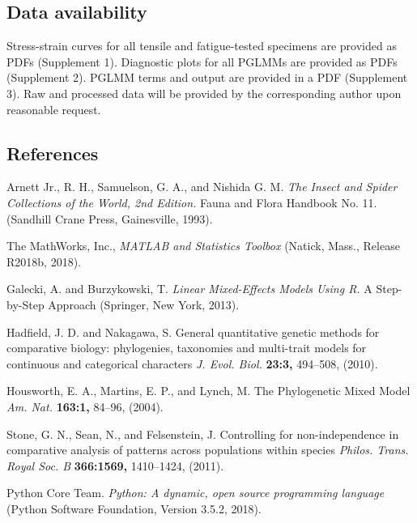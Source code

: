 \documentclass[twocolumn, linenumbers, superscriptaddress, nofootinbib]{revtex4-1}
\begin{document}
		\subsection*{Data availability}
			Stress-strain curves for all tensile and fatigue-tested specimens are provided as PDFs (Supplement 1).
			Diagnostic plots for all PGLMMs are provided as PDFs (Supplement 2). PGLMM terms and output are provided in a PDF (Supplement 3). Raw and processed data will be provided by the corresponding author upon reasonable request.

	\begin{thebibliography}{50}
		\makeatletter
		\addtocounter{NAT@ctr}{45}
		\makeatother
		\section*{References}	
				Arnett Jr., R. H., Samuelson, G. A., and Nishida G. M.
				\textit{The Insect and Spider Collections of the World, 2nd Edition.}
				Fauna and Flora Handbook No. 11.
				(Sandhill Crane Press,
				Gainesville,
				1993).
			
				The MathWorks, Inc.,
				\textit{MATLAB and Statistics Toolbox}
				(Natick, Mass.,
				Release R2018b,
				2018).
			
				Galecki, A. and Burzykowski, T.
				\textit{Linear Mixed-Effects Models Using R.}
				A Step-by-Step Approach
				(Springer,
				New York,
				2013).
			
				Hadfield, J. D. and Nakagawa, S.
				General quantitative genetic methods for comparative biology: phylogenies, taxonomies and multi-trait models for continuous and categorical characters
				\textit{J. Evol. Biol.}
				\textbf{23:3,}
				494--508,
				(2010).
			
				Housworth, E. A., Martins, E. P., and Lynch, M.
				The Phylogenetic Mixed Model
				\textit{Am. Nat.}
				\textbf{163:1,}
				84--96,
				(2004).
			
				Stone, G. N., Sean, N., and Felsenstein, J.
				Controlling for non-independence in comparative analysis of patterns across populations within species
				\textit{Philos. Trans. Royal Soc. B}
				\textbf{366:1569,}
				1410--1424,
				(2011).
			
				Python Core Team.
				\textit{Python: A dynamic, open source programming language}
				(Python Software Foundation, 
				Version 3.5.2,
				2018).
			

\end{thebibliography}
\end{document}
